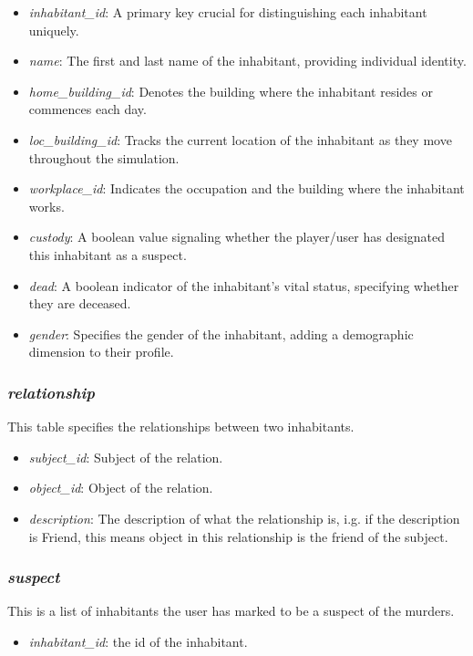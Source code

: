 \documentclass{article}
\begin{document}
\begin{itemize}
    \item \textit{inhabitant\_id}: A primary key crucial for distinguishing each inhabitant uniquely.
    \item \textit{name}: The first and last name of the inhabitant, providing individual identity.
    \item \textit{home\_building\_id}: Denotes the building where the inhabitant resides or commences each day.
    \item \textit{loc\_building\_id}: Tracks the current location of the inhabitant as they move throughout the simulation.
    \item \textit{workplace\_id}: Indicates the occupation and the building where the inhabitant works.
    \item \textit{custody}: A boolean value signaling whether the player/user has designated this inhabitant as a suspect.
    \item \textit{dead}: A boolean indicator of the inhabitant's vital status, specifying whether they are deceased.
    \item \textit{gender}: Specifies the gender of the inhabitant, adding a demographic dimension to their profile.
\end{itemize}

\subsubsection{\textit{relationship}}
This table specifies the relationships between two inhabitants.

\begin{itemize}
    \item \textit{subject\_id}: Subject of the relation.
    \item \textit{object\_id}: Object of the relation.
    \item \textit{description}: The description of what the relationship is, i.g. if the description is Friend, this means object in this relationship is the friend of the subject.
\end{itemize}

\subsubsection{\textit{suspect}}
This is a list of inhabitants the user has marked to be a suspect of the murders.

\begin{itemize}
    \item \textit{inhabitant\_id}: the id of the inhabitant.
\end{itemize}
\end{document}
